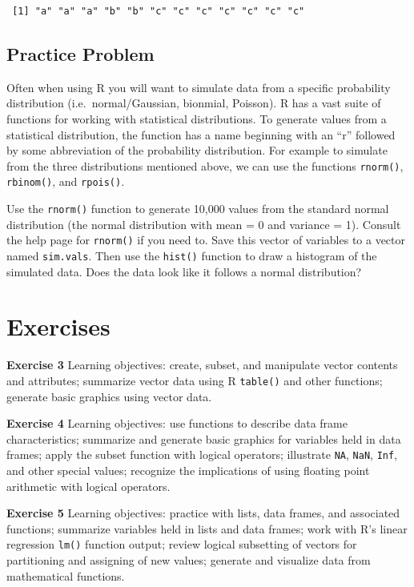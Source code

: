\documentclass[
]{krantz}
\begin{document}
\begin{verbatim}
 [1] "a" "a" "a" "b" "b" "c" "c" "c" "c" "c" "c" "c"
\end{verbatim}

\hypertarget{practice-problem-3}{%
\subsection{Practice Problem}\label{practice-problem-3}}

Often when using R you will want to simulate data from a specific probability distribution (i.e.~normal/Gaussian, bionmial, Poisson). R has a vast suite of functions for working with statistical distributions. To generate values from a statistical distribution, the function has a name beginning with an ``r'' followed by some abbreviation of the probability distribution. For example to simulate from the three distributions mentioned above, we can use the functions \texttt{rnorm()}, \texttt{rbinom()}, and \texttt{rpois()}.

Use the \texttt{rnorm()} function to generate 10,000 values from the standard normal distribution (the normal distribution with mean = 0 and variance = 1). Consult the help page for \texttt{rnorm()} if you need to. Save this vector of variables to a vector named \texttt{sim.vals}. Then use the \texttt{hist()} function to draw a histogram of the simulated data. Does the data look like it follows a normal distribution?

\hypertarget{exercises-1}{%
\section{Exercises}\label{exercises-1}}

\textbf{Exercise 3} Learning objectives: create, subset, and manipulate vector contents and attributes; summarize vector data using R \texttt{table()} and other functions; generate basic graphics using vector data.

\textbf{Exercise 4} Learning objectives: use functions to describe data frame characteristics; summarize and generate basic graphics for variables held in data frames; apply the subset function with logical operators; illustrate \texttt{NA}, \texttt{NaN}, \texttt{Inf}, and other special values; recognize the implications of using floating point arithmetic with logical operators.

\textbf{Exercise 5} Learning objectives: practice with lists, data frames, and associated functions; summarize variables held in lists and data frames; work with R's linear regression \texttt{lm()} function output; review logical subsetting of vectors for partitioning and assigning of new values; generate and visualize data from mathematical functions.
\end{document}
